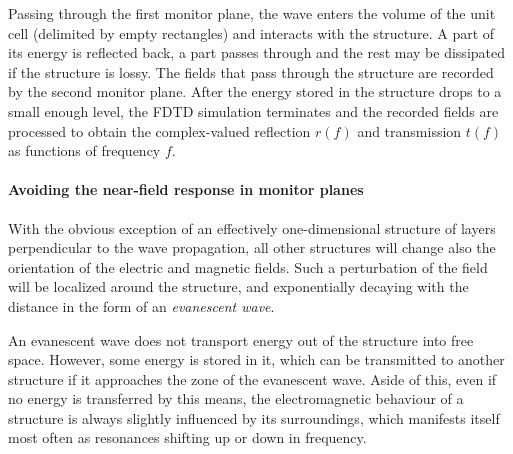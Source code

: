 Passing through the first monitor plane, the wave enters the volume of the unit cell (delimited by empty rectangles) and interacts with the structure. A part of its energy is reflected back, a part passes through and the rest may be dissipated if the structure is lossy. The fields that pass through the structure are recorded by the second monitor plane. After the energy stored in the structure drops to a small enough level, the FDTD simulation terminates and the recorded fields are processed to obtain the complex-valued reflection $r(f)$ and transmission $t(f)$ as functions of frequency $f$. %

\paragraph{Avoiding the near-field response in monitor planes} %
\label{par_nearfield}
With the obvious exception of an effectively one-dimensional structure of layers perpendicular to the wave propagation, all other structures will change also the orientation of the electric and magnetic fields. Such a perturbation of the field will be localized around the structure, and exponentially decaying with the distance in the form of an \textit{evanescent wave}.

An evanescent wave does not transport energy out of the structure into free space. However, some energy is stored in it, which can be transmitted to another structure if it approaches the zone of the evanescent wave. Aside of this, even if no energy is transferred by this means, the electromagnetic behaviour of a structure is always slightly influenced by its surroundings, which manifests itself most often as resonances shifting up or down in frequency.


